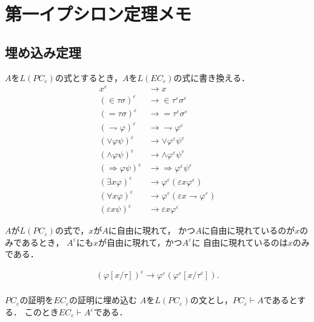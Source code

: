 \section{第一イプシロン定理メモ}
	
\subsection{埋め込み定理}
	$A$を$L(PC_{\varepsilon})$の式とするとき，$A$を$L(EC_{\varepsilon})$の式に書き換える．
	\begin{align}
		x^{\varepsilon} &\rightarrow x \\
		(\in \tau \sigma)^{\varepsilon} &\rightarrow \in \tau^{\varepsilon} \sigma^{\varepsilon} \\
		(= \tau \sigma)^{\varepsilon} &\rightarrow = \tau^{\varepsilon} \sigma^{\varepsilon} \\
		(\rightharpoondown \varphi)^{\varepsilon} &\rightarrow \rightharpoondown \varphi^{\varepsilon} \\
		(\vee \varphi \psi)^{\varepsilon} &\rightarrow \vee \varphi^{\varepsilon} \psi^{\varepsilon} \\
		(\wedge \varphi \psi)^{\varepsilon} &\rightarrow \wedge \varphi^{\varepsilon} \psi^{\varepsilon} \\
		(\Longrightarrow \varphi \psi)^{\varepsilon} &\rightarrow \Longrightarrow \varphi^{\varepsilon} \psi^{\varepsilon} \\
		(\exists x \varphi)^{\varepsilon} &\rightarrow \varphi^{\varepsilon}(\varepsilon x \varphi^{\varepsilon}) \\
		(\forall x \varphi)^{\varepsilon} &\rightarrow \varphi^{\varepsilon}(\varepsilon x \rightharpoondown \varphi^{\varepsilon}) \\
		(\varepsilon x \psi)^{\varepsilon} &\rightarrow \varepsilon x \varphi^{\varepsilon}
	\end{align}
	
	$A$が$L(PC_{\varepsilon})$の式で，$x$が$A$に自由に現れて，
	かつ$A$に自由に現れているのが$x$のみであるとき，
	$A^{\varepsilon}$にも$x$が自由に現れて，かつ$A^{\varepsilon}$に
	自由に現れているのは$x$のみである．
	
	\begin{align}
		(\varphi[x/\tau])^{\varepsilon} \rightarrow \varphi^{\varepsilon}
		(\varphi^{\varepsilon}[x/\tau^{\varepsilon}]). \\
	\end{align}
	
	\begin{itembox}[c]{$PC_{\varepsilon}$の証明を$EC_{\varepsilon}$の証明に埋め込む}
		$A$を$L(PC_{\varepsilon})$の文とし，$PC_{\varepsilon} \vdash A$であるとする．
		このとき$EC_{\varepsilon} \vdash A^{\varepsilon}$である．
	\end{itembox}
	
